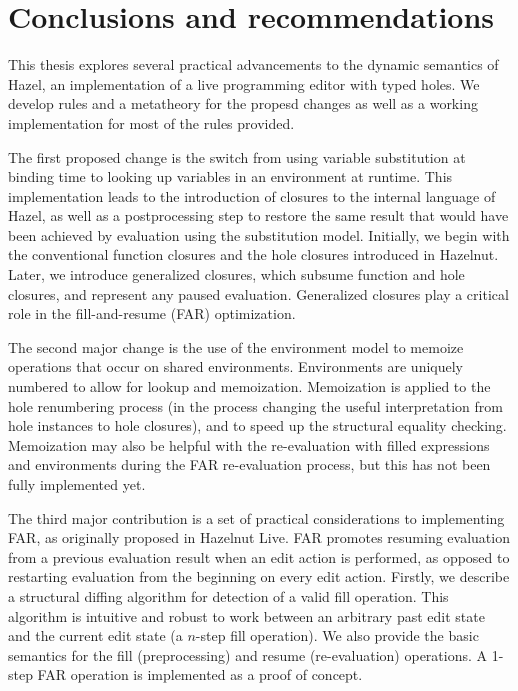 \chapter{Conclusions and recommendations}
\label{sec:concl}

This thesis explores several practical advancements to the dynamic semantics of Hazel, an implementation of a live programming editor with typed holes. We develop rules and a metatheory for the propesd changes as well as a working implementation for most of the rules provided.

The first proposed change is the switch from using variable substitution at binding time to looking up variables in an environment at runtime. This implementation leads to the introduction of closures to the internal language of Hazel, as well as a postprocessing step to restore the same result that would have been achieved by evaluation using the substitution model. Initially, we begin with the conventional function closures and the hole closures introduced in Hazelnut. Later, we introduce generalized closures, which subsume function and hole closures, and represent any paused evaluation. Generalized closures play a critical role in the fill-and-resume (FAR) optimization.

The second major change is the use of the environment model to memoize operations that occur on shared environments. Environments are uniquely numbered to allow for lookup and memoization. Memoization is applied to the hole renumbering process (in the process changing the useful interpretation from hole instances to hole closures), and to speed up the structural equality checking. Memoization may also be helpful with the re-evaluation with filled expressions and environments during the FAR re-evaluation process, but this has not been fully implemented yet.

The third major contribution is a set of practical considerations to implementing FAR, as originally proposed in Hazelnut Live. FAR promotes resuming evaluation from a previous evaluation result when an edit action is performed, as opposed to restarting evaluation from the beginning on every edit action.  Firstly, we describe a structural diffing algorithm for detection of a valid fill operation. This algorithm is intuitive and robust to work between an arbitrary past edit state and the current edit state (a $n$-step fill operation). We also provide the basic semantics for the fill (preprocessing) and resume (re-evaluation) operations. A 1-step FAR operation is implemented as a proof of concept.


